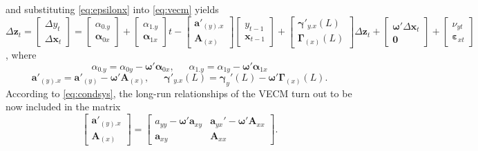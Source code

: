 and substituting \eqref{eq:epsilonx} into \eqref{eq:vecm} yields
\begin{equation}\label{eq:condsys}
\Delta\mathbf{z}_t=\begin{bmatrix}
\Delta y_{t} \\ \Delta\mathbf{x}_{t} 
\end{bmatrix}=\begin{bmatrix}
\alpha_{0.y} \\ \boldsymbol{\alpha}_{0x} 
\end{bmatrix} + \begin{bmatrix}
\alpha_{1.y} \\ \boldsymbol{\alpha}_{1x} 
\end{bmatrix}t- \begin{bmatrix}
\mathbf{a}'_{(y).x} \\ \mathbf{A}_{(x)} 
\end{bmatrix}\begin{bmatrix}
y_{t-1} \\ \mathbf{x}_{t-1} 
\end{bmatrix} + \begin{bmatrix}
\boldsymbol{\gamma}'_{y.x}(L) \\ \boldsymbol{\Gamma}_{(x)}(L) 
\end{bmatrix}\Delta\mathbf{z}_t+\begin{bmatrix}
\boldsymbol{\omega}'\Delta\mathbf{x}_{t} \\ \mathbf{0} 
\end{bmatrix}+\begin{bmatrix}
{\nu}_{yt} \\ \boldsymbol{\varepsilon}_{xt} 
\end{bmatrix} 
\end{equation},
where 
\begin{equation}\label{eq:condintt}
\alpha_{0.y}=\alpha_{0y}-\boldsymbol{\omega}'\boldsymbol{\alpha}_{0x}, \enspace \enspace \enspace \alpha_{1.y}=\alpha_{1y}-\boldsymbol{\omega}'\boldsymbol{\alpha}_{1x}
\end{equation}
\begin{equation}\label{eq:condAmat}
\mathbf{a}'_{(y).x}=\mathbf{a}'_{(y)}-\boldsymbol{\omega}'\mathbf{A}_{(x)}, \enspace \enspace \enspace \boldsymbol{\gamma}'_{y.x}(L)=\boldsymbol{\gamma}_{y}'(L)-\boldsymbol{\omega}'\boldsymbol{\Gamma}_{(x)}(L).
\end{equation}
According to \eqref{eq:condsys}, the long-run relationships of the VECM turn out to be now included in the matrix
\begin{equation}\label{eq:condAmat2}
\begin{bmatrix}
\mathbf{a}'_{(y).x} \\ \mathbf{A}_{(x)} 
\end{bmatrix}=\begin{bmatrix}
a_{yy}-\boldsymbol{\omega}'\mathbf{a}_{xy} & \mathbf{a}_{yx}'-\boldsymbol{\omega}'\mathbf{A}_{xx} \\ \mathbf{a}_{xy}&\mathbf{A}_{xx} 
\end{bmatrix}.
\end{equation}
